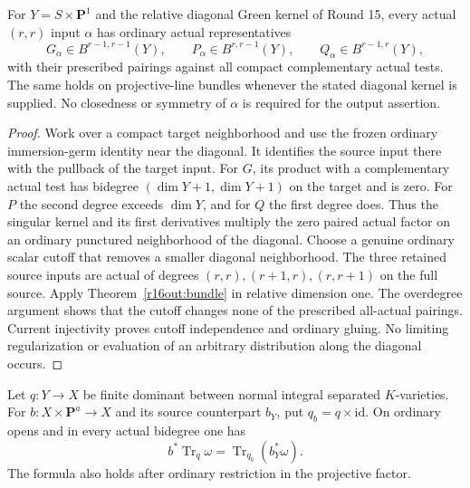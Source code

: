 \begin{corollary}
\label{r16out:green}
For $Y=S\times\mathbf P^1$ and the relative diagonal Green kernel
of Round 15, every actual $(r,r)$ input $\alpha$ has ordinary actual
representatives
\[
 G_\alpha\in B^{r-1,r-1}(Y),\qquad
 P_\alpha\in B^{r,r-1}(Y),\qquad
 Q_\alpha\in B^{r-1,r}(Y),
 \tag{OUT16.14}\label{r16out:green-output}
\]
with their prescribed pairings against all compact complementary
actual tests.  The same holds on projective-line bundles whenever
the stated diagonal kernel is supplied.  No closedness or symmetry
of $\alpha$ is required for the output assertion.
\end{corollary}

\begin{proof}
Work over a compact target neighborhood and use the frozen ordinary
immersion-germ identity near the diagonal.  It identifies the
source input there with the pullback of the target input.  For
$G$, its product with a complementary actual test has bidegree
$(\dim Y+1,\dim Y+1)$ on the target and is zero.  For $P$ the
second degree exceeds $\dim Y$, and for $Q$ the first degree does.
Thus the singular kernel and its first derivatives multiply the
zero paired actual factor on an ordinary punctured neighborhood of
the diagonal.  Choose a genuine ordinary scalar cutoff that removes
a smaller diagonal neighborhood.  The three retained source inputs
are actual of degrees $(r,r),(r+1,r),(r,r+1)$ on the full source.
Apply Theorem~\ref{r16out:bundle} in relative dimension one.
The overdegree argument shows that the cutoff changes none of the
prescribed all-actual pairings.  Current injectivity proves cutoff
independence and ordinary gluing.  No limiting regularization or
evaluation of an arbitrary distribution along the diagonal occurs.
\end{proof}

\begin{lemma}
\label{r16out:finite-coordinate-base-change}
Let $q:Y\to X$ be finite dominant between normal integral separated
$K$-varieties.  For $b:X\times\mathbf P^a\to X$ and its source
counterpart $b_Y$, put $q_b=q\times\mathrm{id}$.  On ordinary opens
and in every actual bidegree one has
\[
 b^*\operatorname{Tr}_q\omega
       =\operatorname{Tr}_{q_b}(b_Y^*\omega).
 \tag{OUT16.15}\label{r16out:finite-coordinate}
\]
The formula also holds after ordinary restriction in the projective
factor.
\end{lemma}

